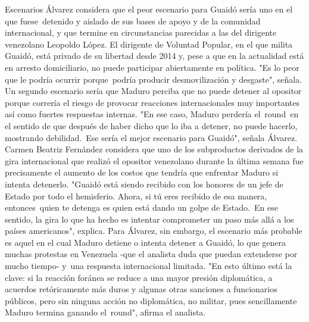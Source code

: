 \documentclass{article}%
\begin{document}
\newline%
%
Escenarios%
\newline%
%
Álvarez considera que el peor escenario para Guaidó sería uno en el que fuese~detenido y aislado de sus bases de apoyo y de la comunidad internacional, y que termine en circunstancias parecidas a las del dirigente venezolano Leopoldo López.%
\newline%
%
El dirigente de Voluntad Popular, en el que milita Guaidó, está privado de su libertad desde 2014 y, pese a que en la actualidad está en arresto domiciliario, no puede participar abiertamente en política.%
\newline%
%
"Es lo peor que le podría ocurrir porque~podría producir desmovilización y desgaste", señala.%
\newline%
%
Un segundo escenario sería que Maduro perciba que no puede detener al opositor porque correría el riesgo de provocar reacciones internacionales muy importantes así como fuertes respuestas internas.%
\newline%
%
"En ese caso, Maduro perdería el~round~en el sentido de que después de haber dicho que lo iba a detener, no puede hacerlo, mostrando debilidad.~Ese sería el mejor escenario para Guaidó", señala Álvarez.%
\newline%
%
Carmen Beatriz Fernández considera que uno de los subproductos derivados de la gira internacional que realizó el opositor venezolano durante la última semana fue precisamente el aumento de los costos que tendría que enfrentar Maduro si intenta detenerlo.%
\newline%
%
"Guaidó está siendo recibido con los honores de un jefe de Estado por todo el hemisferio. Ahora, si tú eres recibido de esa manera, entonces~quien te detenga es quien está dando un golpe de Estado.~En ese sentido, la gira lo que ha hecho es intentar comprometer un paso más allá a los países americanos", explica.%
\newline%
%
Para Álvarez, sin embargo, el escenario más probable es aquel en el cual Maduro detiene o intenta detener a Guaidó, lo que genera muchas protestas en Venezuela {-}que el analista duda que puedan extenderse por mucho tiempo{-} y~una respuesta internacional limitada.%
\newline%
%
"En esto último está la clave: si la reacción foránea se reduce a una mayor presión diplomática, a acuerdos retóricamente más duros y algunas otras sanciones a funcionarios públicos, pero sin ninguna acción no diplomática, no militar, pues sencillamente Maduro termina ganando el~round", afirma el analista.%
\end{document}
